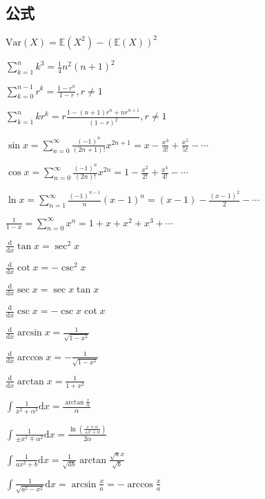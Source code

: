 \documentclass[9pt,landscape]{article}
\begin{document}
\begin{multicols}{3}

\columnseprule=0.25pt

\section{公式}

$\mathrm{Var}(X)=\mathbb{E}(X^2)-(\mathbb{E}(X))^2$

$\sum_{k=1}^{n}k^3=\frac{1}{4}n^2(n+1)^2$

$\sum_{k=0}^{n-1}r^k=\frac{1-r^n}{1-r}, r\neq 1$

$\sum_{k=1}^{n}kr^k=r\frac{1-(n+1)r^n+nr^{n+1}}{(1-r)^2}, r\neq 1$

$\sin x = \sum_{n=0}^{\infty} \frac{(-1)^n}{(2n+1)!}x^{2n+1} = x - \frac{x^3}{3!} + \frac{x^5}{5!} - \cdots$

$\cos x = \sum_{n=0}^{\infty} \frac{(-1)^n}{(2n)!}x^{2n} = 1 - \frac{x^2}{2!} + \frac{x^4}{4!} - \cdots$

$\ln x = \sum_{n=1}^{\infty} \frac{(-1)^{n-1}}{n}(x-1)^n = (x-1) - \frac{(x-1)^2}{2} - \cdots$

$\frac{1}{1-x} = \sum_{n=0}^{\infty} x^n = 1 + x + x^2 + x^3 + \cdots$

$\frac{\mathrm{d}}{\mathrm{d}x}\tan x=\sec ^{2}x$

$\frac{\mathrm{d}}{\mathrm{d}x}\cot x=-\csc ^{2}x$

$\frac{\mathrm{d}}{\mathrm{d}x}\sec x=\sec x\tan x$

$\frac{\mathrm{d}}{\mathrm{d}x}\csc x=-\csc x\cot x$

$\frac{\mathrm{d}}{\mathrm{d}x}\arcsin x={\frac {1}{\sqrt {1-x^{2}}}}$

$\frac{\mathrm{d}}{\mathrm{d}x}\arccos x=-{\frac {1}{\sqrt {1-x^{2}}}}$

$\frac{\mathrm{d}}{\mathrm{d}x}\arctan x={\frac {1}{1+x^{2}}}$

$ \int {\frac {1}{x^{2}+\alpha ^{2}}}{\mbox{d}}x={\frac {\arctan {\frac {x}{\alpha }}}{\alpha }} $

$ \int {\frac {1}{\pm x^{2}\mp \alpha ^{2}}}{\mbox{d}}x={\frac {\ln \left({\frac {x\mp \alpha }{\pm x+\alpha }}\right)}{2\alpha }} $

$ \int {\frac {1}{ax^{2}+b}}{\mbox{d}}x={\frac {1}{\sqrt {ab}}}\arctan {\frac {{\sqrt {a}}x}{\sqrt {b}}} $

$ \int {\frac {1}{\sqrt {a^{2}-x^{2}}}}{\mbox{d}}x=\arcsin {\frac {x}{a}}=-\arccos {\frac {x}{a}} $


\end{multicols}
\end{document}
